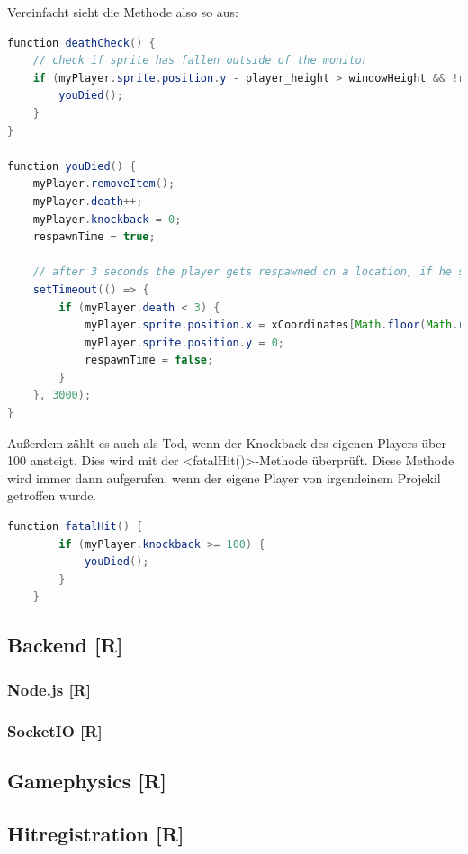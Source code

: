 Vereinfacht sieht die Methode also so aus:

\begin{lstlisting}[caption=Überprüfung nach Toden,language=Java,label=lst:impl:deathCheck]
function deathCheck() {
    // check if sprite has fallen outside of the monitor
    if (myPlayer.sprite.position.y - player_height > windowHeight && !respawnTime) {
        youDied();
    }
}

function youDied() {
    myPlayer.removeItem();
    myPlayer.death++;
    myPlayer.knockback = 0;
    respawnTime = true;

    // after 3 seconds the player gets respawned on a location, if he still has at least one live left
    setTimeout(() => {
        if (myPlayer.death < 3) {
            myPlayer.sprite.position.x = xCoordinates[Math.floor(Math.random() * xCoordinates.length)];
            myPlayer.sprite.position.y = 0;
            respawnTime = false;
        }
    }, 3000);
}
\end{lstlisting}

Außerdem zählt es auch als Tod, wenn der Knockback des eigenen Players über 100 ansteigt. Dies wird mit der <fatalHit()>-Methode überprüft.
Diese Methode wird immer dann aufgerufen, wenn der eigene Player von irgendeinem Projekil getroffen wurde.
\begin{lstlisting}[caption=Fatal Hit,language=Java,label=lst:impl:falatHit]
    function fatalHit() {
        if (myPlayer.knockback >= 100) {
            youDied();
        }
    } 
\end{lstlisting}







\subsection{Backend [R]}
\subsubsection{Node.js [R]}
\subsubsection{SocketIO [R]}
\subsection{Gamephysics [R]}
\subsection{Hitregistration [R]}
